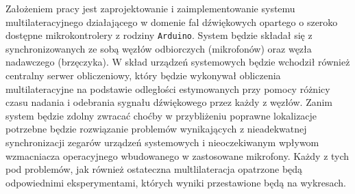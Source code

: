 Założeniem pracy jest zaprojektowanie i zaimplementowanie systemu multilateracyjnego działającego w domenie fal dźwiękowych opartego o szeroko dostępne mikrokontrolery z rodziny \texttt{Arduino}. System będzie składał się z synchronizowanych ze sobą węzłów odbiorczych (mikrofonów) oraz węzła nadawczego (brzęczyka). W skład urządzeń systemowych będzie wchodził również centralny serwer obliczeniowy, który będzie wykonywał obliczenia multilateracyjne na podstawie odległości estymowanych przy pomocy różnicy czasu nadania i odebrania sygnału dźwiękowego przez każdy z węzłów. Zanim system będzie zdolny zwracać choćby w przybliżeniu poprawne lokalizacje potrzebne będzie rozwiązanie problemów wynikających z nieadekwatnej synchronizacji zegarów urządzeń systemowych i nieoczekiwanym wpływom wzmacniacza operacyjnego wbudowanego w zastosowane mikrofony. Każdy z tych pod problemów, jak również ostateczna multlilateracja opatrzone będą odpowiednimi eksperymentami, których wyniki przestawione będą na wykresach.
